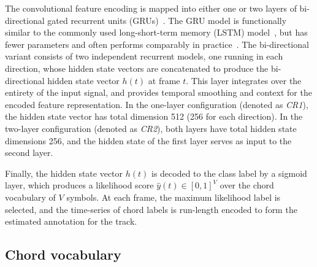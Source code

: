 \documentclass{article}
\begin{document}
The convolutional feature encoding is mapped into either one or two layers of bi-directional gated recurrent units (GRUs)~\cite{cho2014learning}.
The GRU model is functionally similar to the commonly used long-short-term memory (LSTM) model~\cite{hochreiter1997long}, but has fewer parameters and often performs comparably in practice~\cite{jozefowicz2015empirical}.
The bi-directional variant consists of two independent recurrent models, one running in each direction, whose hidden state vectors are concatenated to produce the bi-directional hidden state vector $h(t)$ at frame $t$.
This layer integrates over the entirety of the input signal, and provides temporal smoothing and context for the encoded feature representation.
In the one-layer configuration (denoted as \emph{CR1}), the hidden state vector has total dimension 512 (256 for each direction).
In the two-layer configuration (denoted as \emph{CR2}), both layers have total hidden state dimensions 256, and the hidden state of the first layer serves as input to the second layer.

%

Finally, the hidden state vector $h(t)$ is decoded to the class label by a sigmoid layer, which produces a likelihood score $\hat{y}(t) \in [0, 1]^{V}$ over the chord vocabulary of $V$ symbols.
At each frame, the maximum likelihood label is selected, and the time-series of chord labels is run-length encoded to form the estimated annotation for the track.











\subsection{Chord vocabulary}

\label{sec:vocab}
%
\end{document}
